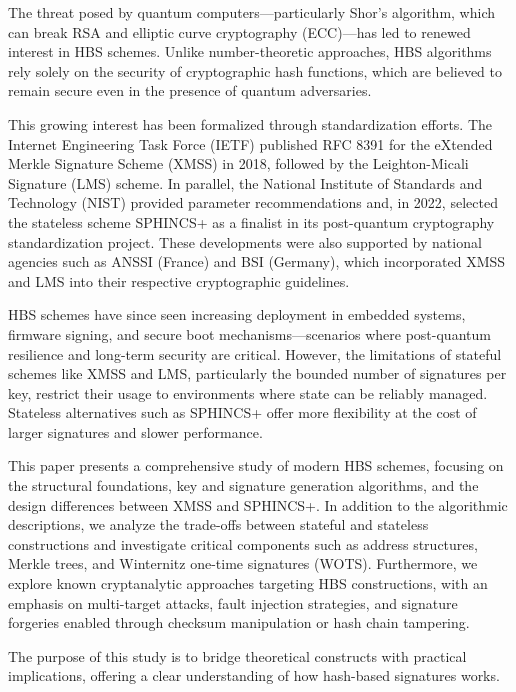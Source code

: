 \documentclass[runningheads]{llncs}
\begin{document}
The threat posed by quantum computers—particularly Shor's algorithm, which can break RSA and elliptic curve cryptography (ECC)—has led to renewed interest in HBS schemes. Unlike number-theoretic approaches, HBS algorithms rely solely on the security of cryptographic hash functions, which are believed to remain secure even in the presence of quantum adversaries.

This growing interest has been formalized through standardization efforts. The Internet Engineering Task Force (IETF) published RFC 8391 for the eXtended Merkle Signature Scheme (XMSS) in 2018, followed by the Leighton-Micali Signature (LMS) scheme. In parallel, the National Institute of Standards and Technology (NIST) provided parameter recommendations and, in 2022, selected the stateless scheme SPHINCS+ as a finalist in its post-quantum cryptography standardization project. These developments were also supported by national agencies such as ANSSI (France) and BSI (Germany), which incorporated XMSS and LMS into their respective cryptographic guidelines.

HBS schemes have since seen increasing deployment in embedded systems, firmware signing, and secure boot mechanisms—scenarios where post-quantum resilience and long-term security are critical. However, the limitations of stateful schemes like XMSS and LMS, particularly the bounded number of signatures per key, restrict their usage to environments where state can be reliably managed. Stateless alternatives such as SPHINCS+ offer more flexibility at the cost of larger signatures and slower performance.

This paper presents a comprehensive study of modern HBS schemes, focusing on the structural foundations, key and signature generation algorithms, and the design differences between XMSS and SPHINCS+. In addition to the algorithmic descriptions, we analyze the trade-offs between stateful and stateless constructions and investigate critical components such as address structures, Merkle trees, and Winternitz one-time signatures (WOTS). Furthermore, we explore known cryptanalytic approaches targeting HBS constructions, with an emphasis on multi-target attacks, fault injection strategies, and signature forgeries enabled through checksum manipulation or hash chain tampering.

The purpose of this study is to bridge theoretical constructs with practical implications, offering a clear understanding of how hash-based signatures works.





\newpage


\newpage

\printbibliography
\end{document}
